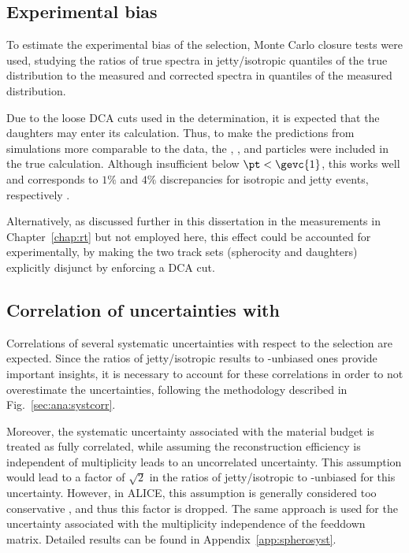 \subsection{Experimental bias}

To estimate the experimental bias of the \SOPT selection, Monte Carlo closure tests were used, studying the ratios of true \pt spectra in jetty/isotropic quantiles of the true \SOPT distribution to the measured and corrected \pt spectra in quantiles of the measured \SOPT distribution.

Due to the loose DCA cuts used in the \SOPT determination, it is expected that the \VO daughters may enter its calculation. Thus, to make the predictions from simulations more comparable to the data, the \KOs, \LA, and \AL particles were included in the true \SOPT calculation. Although insufficient below $\pt < \gevc{1}$, this works well and corresponds to $1\%$ and $4\%$ discrepancies for isotropic and jetty events, respectively \cite{nassirpourShapeStrangenessTransverse2022}. 

Alternatively, as discussed further in this dissertation in the \RT measurements in Chapter~\ref{chap:rt} but not employed here, this effect could be accounted for experimentally, by making the two track sets (spherocity and \VO daughters) explicitly disjunct by enforcing a DCA cut.

\subsection{Correlation of uncertainties with \SOPT}

Correlations of several systematic uncertainties with respect to the \SOPT selection are expected. Since the ratios of jetty/isotropic results to \SOPT-unbiased ones provide important insights, it is necessary to account for these correlations in order to not overestimate the uncertainties, following the methodology described in Fig.~\ref{sec:ana:systcorr}.

Moreover, the systematic uncertainty associated with the material budget is treated as fully correlated, while assuming the reconstruction efficiency is independent of multiplicity leads to an uncorrelated uncertainty. This assumption would lead to a factor of $\sqrt{2}$ in the ratios of jetty/isotropic to \SOPT-unbiased for this uncertainty. However, in ALICE, this assumption is generally considered too conservative \cite{alicecollaborationMultiplicityDependenceLightflavor2019}, and thus this factor is dropped. The same approach is used for the uncertainty associated with the multiplicity independence of the feeddown matrix. Detailed results can be found in Appendix~\ref{app:spherosyst}.

